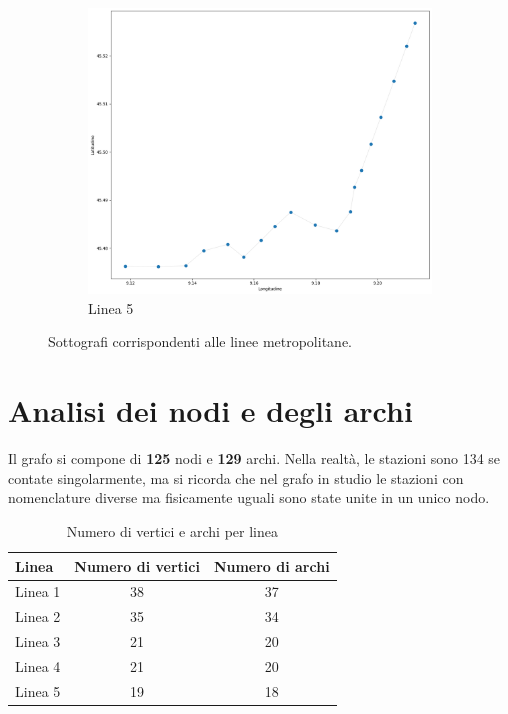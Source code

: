 \begin{figure}[htbp]
  \vspace{0.02\textheight}
  \begin{subfigure}[b]{0.40\textwidth}
    \centering
    \includegraphics[width=\textwidth]{Immagini/Capitoli/cap3/rete_5.png}
    \caption{Linea 5}
    \label{fig:m5}
  \end{subfigure}

  \caption{Sottografi corrispondenti alle linee metropolitane.}
  \label{fig:sottografi}
\end{figure}

\section{Analisi dei nodi e degli archi}
Il grafo si compone di \textbf{125} nodi e \textbf{129} archi. Nella realtà, le stazioni sono 134 se contate singolarmente, ma si ricorda che nel grafo in studio le stazioni con nomenclature diverse ma fisicamente uguali sono state unite in un unico nodo. 

\vspace{1em}
\begin{table}[h!]
\centering
\begin{tabular}{l c c}
\hline
\textbf{Linea} & \textbf{Numero di vertici} & \textbf{Numero di archi} \\
\hline
Linea 1 & 38 & 37\\
Linea 2 & 35 & 34\\
Linea 3 & 21 & 20\\
Linea 4 & 21 & 20\\
Linea 5 & 19 & 18\\
\hline
\end{tabular}
\caption{Numero di vertici e archi per linea}
\label{tab: Numero di vertici e archi per linea}
\end{table}
\vspace{1em}

